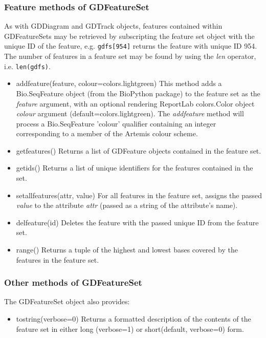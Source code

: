 \documentclass{article}
\begin{document}
\subsubsection{Feature methods of GDFeatureSet}
As with GDDiagram and GDTrack objects, features contained within GDFeatureSets 
may be retrieved by subscripting the feature set object with the unique ID of 
the feature, e.g. \texttt{gdfs[954]} returns the feature with unique ID 954.  
The number of features in a feature set may be found by using the 
\textit{len} operator, i.e. \texttt{len(gdfs)}.

\begin{itemize}
\item {add\us feature(feature, colour=colors.lightgreen)}
This method adds a Bio.SeqFeature object (from the BioPython package) to the 
feature set as the \textit{feature} argument, with an optional rendering 
ReportLab colors.Color object \textit{colour} argument 
(default=colors.lightgreen).  The \textit{add\us feature} method will process 
a Bio.SeqFeature 'colour' qualifier containing an integer corresponding to 
a member of the Artemis colour scheme.
\item {get\us features()}
Returns a list of GDFeature objects contained in the feature set.
\item {get\us ids()}
Returns a list of unique identifiers for the features contained in the set.
\item {set\us all\us features(attr, value)}
For all features in the feature set, assigns the passed \textit{value} to 
the attribute \textit{attr} (passed as a string of the attribute's name).
\item {del\us feature(id)}
Deletes the feature with the passed unique ID from the feature set.
\item {range()}
Returns a tuple of the highest and lowest bases covered by the features in 
the feature set.
\end{itemize}

\subsubsection{Other methods of GDFeatureSet}
The GDFeatureSet object also provides:
\begin{itemize}
\item {to\us string(verbose=0)}
Returns a formatted description of the contents of the feature set in either 
long (verbose=1) or short(default, verbose=0) form.
\end{itemize}
\end{document}
